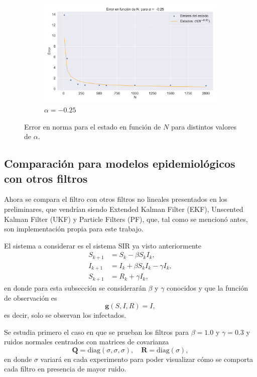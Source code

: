 \begin{figure}[h!]
\begin{subfigure}[b]{0.49\textwidth}
        \includegraphics[width=\linewidth]{img/content/chapter4/linear_error_025.pdf}
    \caption{$\alpha = -0.25$}
    \label{fig:linear_error_025}
    \end{subfigure}    
    \caption{Error en norma para el estado en función de $N$ para distintos valores de $\alpha$.}
\end{figure}

\subsection{Comparación para modelos epidemiológicos con otros filtros}

Ahora se compara el filtro con otros filtros no lineales presentados en los preliminares, que vendrían siendo Extended Kalman Filter (EKF), Unscented Kalman Filter (UKF) y Particle Filters (PF), que, tal como se mencionó antes, son implementación propia para este trabajo. 

El sistema a considerar es el sistema SIR ya visto anteriormente
\begin{equation*}
    \begin{aligned}
    S_{k+1} &= S_k -\beta S_k I_k, \\
    I_{k+1} &= I_k + \beta S_k I_k - \gamma I_k, \\
    S_{k+1} &= R_k + \gamma I_k,
    \end{aligned}
\end{equation*}
en donde para esta subsección se considerarán $\beta$ y $\gamma$ conocidos y que la función de observación es
\begin{equation*}
    \mathbf{g}(S, I, R) = I,
\end{equation*}
es decir, solo se observan los infectados.

Se estudia primero el caso en que se prueban los filtros para $\beta = 1.0$ y $\gamma = 0.3$ y ruidos normales centrados con matrices de covarianza
\begin{equation*}
    \mathbf{Q} = \text{diag}(\sigma, \sigma, \sigma), \quad \mathbf{R} = \text{diag}(\sigma),
\end{equation*}
en donde $\sigma$ variará en cada experimento para poder visualizar cómo se comporta cada filtro en presencia de mayor ruido.

